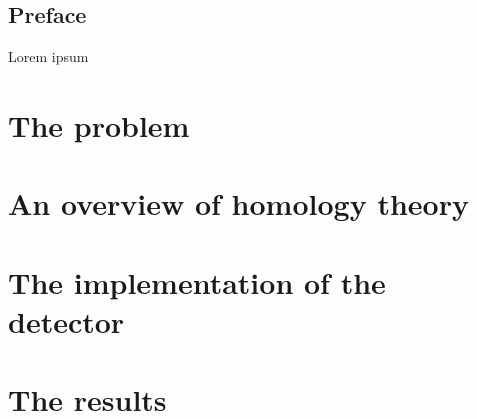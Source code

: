 \documentclass[12pt, oneside]{book}
\title{}
\author{Arnau Mas}
\date{}
\begin{document}
\maketitle
\thispagestyle{empty}

\pagestyle{plain}
\frontmatter
{\footnotesize \tableofcontents}

\pagebreak
{}
\section*{Preface}
Lorem ipsum

\mainmatter
\pagestyle{main}

\chapter{The problem}\label{ch:problem}


\chapter{An overview of homology theory}


\chapter{The implementation of the detector}


\chapter{The results}


\backmatter
\pagestyle{plain}
\printbibliography
\end{document}
